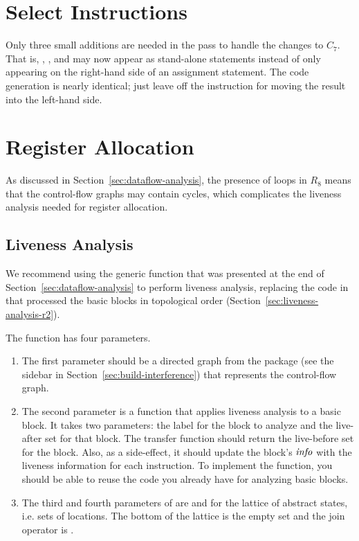 \documentclass[11pt]{book}
\begin{document}
\section{Select Instructions}
\label{sec:select-instructions-loop}

Only three small additions are needed in the
 pass to handle the changes to $C_7$.  That
is, , , and  may now appear as
stand-alone statements instead of only appearing on the right-hand
side of an assignment statement. The code generation is nearly
identical; just leave off the instruction for moving the result into
the left-hand side.

\section{Register Allocation}
\label{sec:register-allocation-loop}

As discussed in Section~\ref{sec:dataflow-analysis}, the presence of
loops in $R_8$ means that the control-flow graphs may contain cycles,
which complicates the liveness analysis needed for register
allocation.

\subsection{Liveness Analysis}
\label{sec:liveness-analysis-r8}

We recommend using the generic  function that
was presented at the end of Section~\ref{sec:dataflow-analysis} to
perform liveness analysis, replacing the code in
 that processed the basic blocks in topological
order (Section~\ref{sec:liveness-analysis-r2}).

The  function has four parameters.
\begin{enumerate}
\item The first parameter  should be a directed graph from the
   package (see the sidebar in
  Section~\ref{sec:build-interference}) that represents the
  control-flow graph.
\item The second parameter  is a function that applies
  liveness analysis to a basic block. It takes two parameters: the
  label for the block to analyze and the live-after set for that
  block.  The transfer function should return the live-before set for
  the block.  Also, as a side-effect, it should update the block's
  $\mathit{info}$ with the liveness information for each instruction. To
  implement the  function, you should be able to reuse
  the code you already have for analyzing basic blocks.
\item The third and fourth parameters of  are
   and  for the lattice of abstract states,
  i.e.  sets of locations. The bottom of the lattice is the empty set
   and the join operator is .
\end{enumerate}
\end{document}
